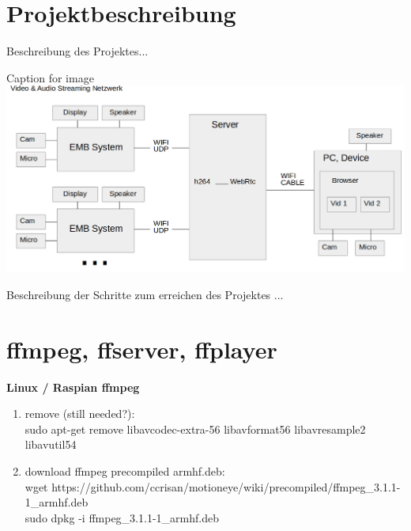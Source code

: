 \section{Projektbeschreibung}

Beschreibung des Projektes...


\begin{minipage}{\textwidth}
    \begin{center}
        Caption for image
        \includegraphics[scale=0.4]{img/schemaproj.png} 
    \end{center}
\end{minipage}


Beschreibung der Schritte zum erreichen des Projektes
...

\section{ffmpeg, ffserver, ffplayer}

\textbf{Linux / Raspian ffmpeg} %

\begin{enumerate}
	\item remove (still needed?):\\
	sudo apt-get remove libavcodec-extra-56 libavformat56 libavresample2 libavutil54
	\item download ffmpeg precompiled armhf.deb:\\
	wget https://github.com/ccrisan/motioneye/wiki/precompiled/ffmpeg\_3.1.1-1\_armhf.deb\\
	sudo dpkg -i ffmpeg\_3.1.1-1\_armhf.deb
\end{enumerate}


